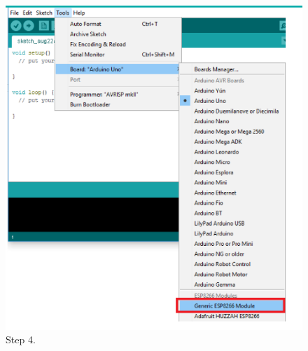\documentclass[a4paper,12pt,oneside]{article}
\begin{document}
\begin{itemize}
\begin{figure}[H]
\begin{center}
\includegraphics[scale=0.7]{hinh/caidatesp4.png}
\end{center}
\caption{Step 4.}
\end{figure}
\end{itemize}
\end{document}
